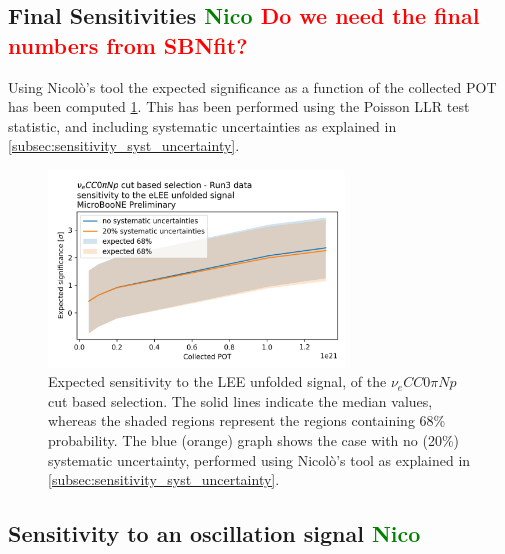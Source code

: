 \documentclass[a4paper]{article}
\newcommand{\nueccnopinp}{$\nu_e CC 0\pi Np$ }
\begin{document}
\subsection{Final Sensitivities \textcolor{green}{Nico} \textcolor{red}{Do we need the final numbers from SBNfit?}}

Using Nicol\`o's tool the expected significance as a function of the collected POT has been computed \ref{fig:sensitivity_function_pot}.
This has been performed using the Poisson LLR test statistic, and including systematic uncertainties as explained in \ref{subsec:sensitivity_syst_uncertainty}.

\begin{figure}[H]
    \begin{center}
    \includegraphics[width=0.7\textwidth]{Sensitivity/sensitivity_vs_pot.png}
    \caption{Expected sensitivity to the LEE unfolded signal, of the \nueccnopinp cut based selection. The solid lines indicate the median values, whereas the shaded regions represent the regions containing 68\% probability.
    The blue (orange) graph shows the case with no (20\%) systematic uncertainty, performed using Nicol\`o's tool as explained in \ref{subsec:sensitivity_syst_uncertainty}.
    }
    \label{fig:sensitivity_function_pot}
    \end{center}
\end{figure}

\subsection{Sensitivity to an oscillation signal \textcolor{green}{Nico}}
\end{document}
